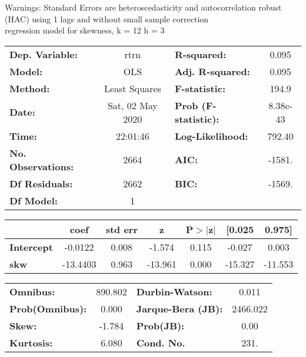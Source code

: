 Warnings: \newline
 [1] Standard Errors are heteroscedasticity and autocorrelation robust (HAC) using 1 lags and without small sample correction\\ 

regression model for skewness, k = 12 h = 3\begin{center}
\begin{tabular}{lclc}
\toprule
\textbf{Dep. Variable:}    &       rtrn       & \textbf{  R-squared:         } &     0.095   \\
\textbf{Model:}            &       OLS        & \textbf{  Adj. R-squared:    } &     0.095   \\
\textbf{Method:}           &  Least Squares   & \textbf{  F-statistic:       } &     194.9   \\
\textbf{Date:}             & Sat, 02 May 2020 & \textbf{  Prob (F-statistic):} &  8.38e-43   \\
\textbf{Time:}             &     22:01:46     & \textbf{  Log-Likelihood:    } &    792.40   \\
\textbf{No. Observations:} &        2664      & \textbf{  AIC:               } &    -1581.   \\
\textbf{Df Residuals:}     &        2662      & \textbf{  BIC:               } &    -1569.   \\
\textbf{Df Model:}         &           1      & \textbf{                     } &             \\
\bottomrule
\end{tabular}
\begin{tabular}{lcccccc}
                   & \textbf{coef} & \textbf{std err} & \textbf{z} & \textbf{P$> |$z$|$} & \textbf{[0.025} & \textbf{0.975]}  \\
\midrule
\textbf{Intercept} &      -0.0122  &        0.008     &    -1.574  &         0.115        &       -0.027    &        0.003     \\
\textbf{skw}       &     -13.4403  &        0.963     &   -13.961  &         0.000        &      -15.327    &      -11.553     \\
\bottomrule
\end{tabular}
\begin{tabular}{lclc}
\textbf{Omnibus:}       & 890.802 & \textbf{  Durbin-Watson:     } &    0.011  \\
\textbf{Prob(Omnibus):} &   0.000 & \textbf{  Jarque-Bera (JB):  } & 2466.022  \\
\textbf{Skew:}          &  -1.784 & \textbf{  Prob(JB):          } &     0.00  \\
\textbf{Kurtosis:}      &   6.080 & \textbf{  Cond. No.          } &     231.  \\
\bottomrule
\end{tabular}
\end{center}

